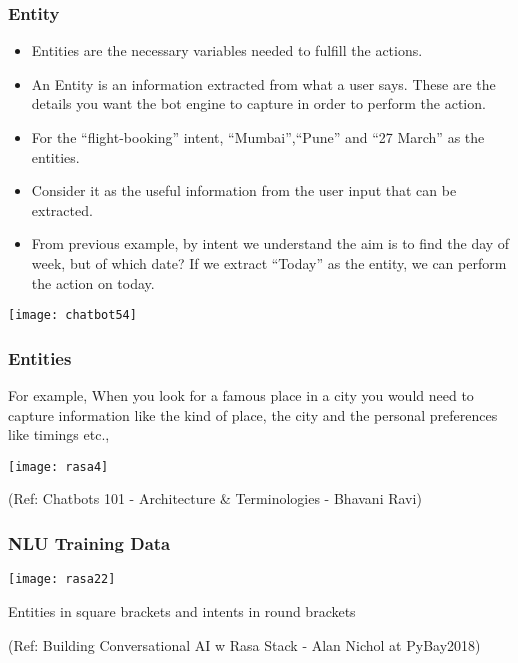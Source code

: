  \begin{frame}[fragile]\frametitle{Entity}
\begin{itemize}
\item Entities are the necessary variables needed to fulfill the actions.
\item An Entity is an information extracted from what a user says. These are the details you want the bot engine to capture in order to perform the action.
\item For the ``flight-booking'' intent, ``Mumbai'',``Pune'' and ``27 March'' as the entities. 
\item Consider it as the useful information from the user input that can be extracted. 
\item From previous example, by intent we understand the aim is to find the day of week, but of which date? If we extract ``Today'' as the entity, we can perform the action on today.
\end{itemize}

\begin{center}
\texttt{[image: chatbot54]}
\end{center}

\end{frame}

 \begin{frame}[fragile]\frametitle{Entities}
For example, When you look for a famous place in a city you would need to capture information like the kind of place, the city and the personal preferences like timings etc.,


\begin{center}
\texttt{[image: rasa4]}
\end{center}

{\tiny (Ref: Chatbots 101 - Architecture \& Terminologies -  Bhavani Ravi)}

\end{frame}


 \begin{frame}[fragile]\frametitle{NLU Training Data}

\begin{center}
\texttt{[image: rasa22]}
\end{center}

Entities in square brackets and intents in round brackets

{\tiny (Ref: Building Conversational AI w Rasa Stack - Alan Nichol at PyBay2018)}

\end{frame}



